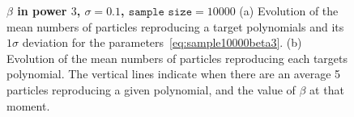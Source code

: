 \documentclass[11pt]{article}
\begin{document}
\begin{enumerate}
	  \begin{figure}[h!]
	  	\centering
	  	\caption{{\bfseries \boldmath $\beta$ in power $3$, $\sigma = 0.1$, $\texttt{sample size} = 10000$} (a) Evolution of the mean numbers of particles reproducing a target polynomials and its $1\sigma$ deviation for the parameters~\eqref{eq:sample10000beta3}. (b) Evolution of the mean numbers of particles reproducing each targets polynomial. The vertical lines indicate when there are an average 5 particles reproducing a given polynomial, and the value of $\beta$ at that moment.}
	  	\label{fig:sample10000beta3}
	  \end{figure}


\end{enumerate}
\end{document}
